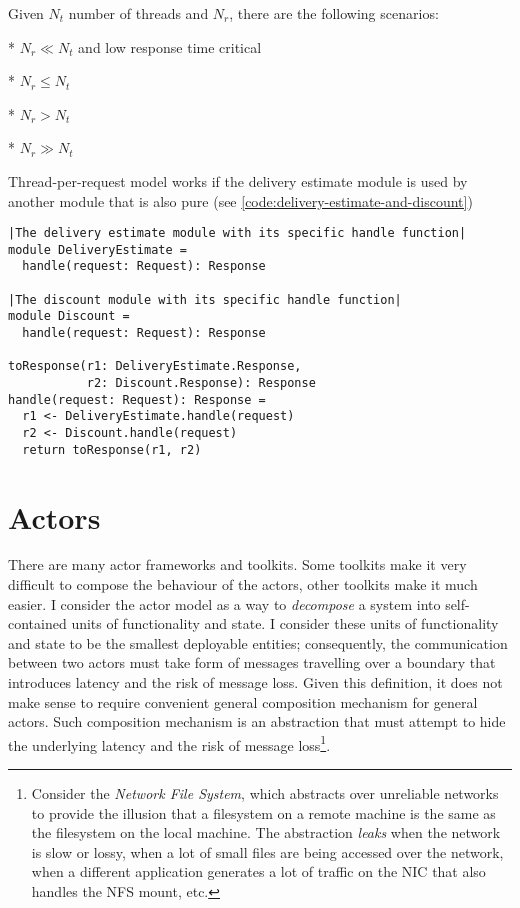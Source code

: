 Given $N_{t}$ number of threads and $N_{r}$, there are the following scenarios:

* $N_{r} \ll N_{t}$ and low response time critical

* $N_{r} \le N_{t}$ 

* $N_{r} > N_{t}$

* $N_{r} \gg N_{t}$

Thread-per-request model works if the delivery estimate module is used by another module that is also pure (see \autoref{code:delivery-estimate-and-discount})

\begin{lstlisting}[caption={Delivery and discount}, label={code:delivery-estimate-and-discount}, language=Pseudo, escapechar=|]
|The delivery estimate module with its specific handle function|
module DeliveryEstimate =
  handle(request: Request): Response

|The discount module with its specific handle function|
module Discount =
  handle(request: Request): Response

toResponse(r1: DeliveryEstimate.Response,
           r2: Discount.Response): Response
handle(request: Request): Response = 
  r1 <- DeliveryEstimate.handle(request)
  r2 <- Discount.handle(request)
  return toResponse(r1, r2)

\end{lstlisting}

\section{Actors}
There are many actor frameworks and toolkits\cite{akka,scalaz8,transient,thespian}. Some toolkits make it very difficult to compose the behaviour of the actors\cite{akka,thespian}, other toolkits make it much easier\cite{scalaz8,transient}. I consider the actor model as a way to \emph{decompose} a system into self-contained units of functionality and state. I consider these units of functionality and state to be the smallest deployable entities; consequently, the communication between two actors must take form of messages travelling over a boundary that introduces latency and the risk of message loss. Given this definition, it does not make sense to require convenient general composition mechanism for general actors. Such composition mechanism is an abstraction that must attempt to hide the underlying latency and the risk of message loss\footnote{Consider the \emph{Network File System}, which abstracts over unreliable networks to provide the illusion that a filesystem on a remote machine is the same as the filesystem on the local machine. The abstraction \emph{leaks} when the network is slow or lossy, when a lot of small files are being accessed over the network, when a different application generates a lot of traffic on the NIC that also handles the NFS mount, etc.}. 


\printbibliography


